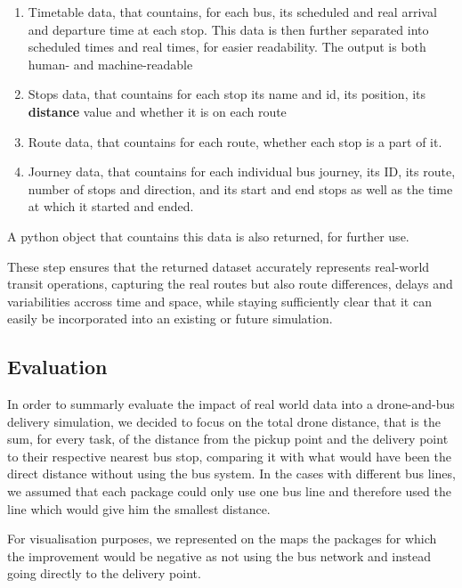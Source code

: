 \begin{enumerate}
    \item Timetable data, that countains, for each bus, its scheduled and real arrival and departure time at each stop. This data is then further separated into scheduled times and real times, for easier readability. The output is both human- and machine-readable
    \item Stops data, that countains for each stop its name and id, its position, its \textbf{distance} value and whether it is on each route
    \item Route data, that countains for each route, whether each stop is a part of it.
    \item Journey data, that countains for each individual bus journey, its ID, its route, number of stops and direction, and its start and end stops as well as the time at which it started and ended.
\end{enumerate} A python object that countains this data is also returned, for further use.

These step ensures that the returned dataset accurately represents real-world transit operations, capturing the real routes but also route differences, delays and variabilities accross time and space, while staying sufficiently clear that it can easily be incorporated into an existing or future simulation.

\subsection{Evaluation}

In order to summarly evaluate the impact of real world data into a drone-and-bus delivery simulation, we decided to focus on the total drone distance, that is the sum, for every task, of the distance from the pickup point and the delivery point to their respective nearest bus stop, comparing it with what would have been the direct distance without using the bus system. In the cases with different bus lines, we assumed that each package could only use one bus line and therefore used the line which would give him the smallest distance.

For visualisation purposes, we represented on the maps the packages for which the improvement would be negative as not using the bus network and instead going directly to the delivery point.



